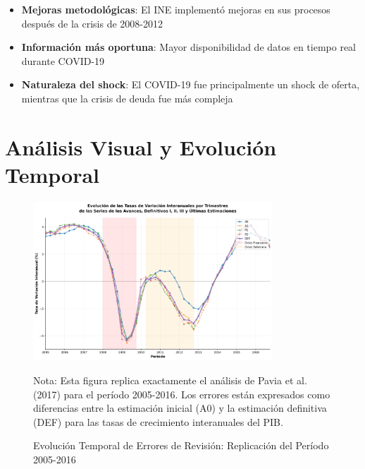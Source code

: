 \documentclass[12pt,a4paper]{article}
\begin{document}
\begin{itemize}
\item \textbf{Mejoras metodológicas}: El INE implementó mejoras en sus procesos después de la crisis de 2008-2012
\item \textbf{Información más oportuna}: Mayor disponibilidad de datos en tiempo real durante COVID-19
\item \textbf{Naturaleza del shock}: El COVID-19 fue principalmente un shock de oferta, mientras que la crisis de deuda fue más compleja
\end{itemize}

\section{Análisis Visual y Evolución Temporal}

\begin{figure}[h]
\centering
\includegraphics[width=0.8\textwidth]{../figuras/figura_2_pavia_robusta_2005_2016.png}
\caption{Evolución Temporal de Errores de Revisión: Replicación del Período 2005-2016}
\label{fig:evolucion_2005_2016}
\begin{flushleft}
\footnotesize
Nota: Esta figura replica exactamente el análisis de Pavia et al. (2017) para el período 2005-2016. Los errores están expresados como diferencias entre la estimación inicial (A0) y la estimación definitiva (DEF) para las tasas de crecimiento interanuales del PIB.
\end{flushleft}
\end{figure}
\end{document}
